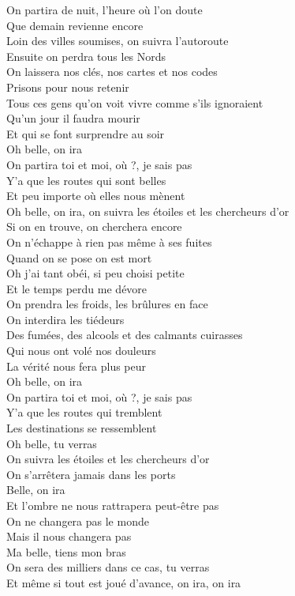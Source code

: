 \documentclass{novel}
\begin{document}
\begin{multicols}{2}
On partira de nuit, l'heure où l'on doute \\
Que demain revienne encore \\
Loin des villes soumises, on suivra l'autoroute \\
Ensuite on perdra tous les Nords \\

On laissera nos clés, nos cartes et nos codes \\
Prisons pour nous retenir \\
Tous ces gens qu'on voit vivre comme s'ils ignoraient \\
Qu'un jour il faudra mourir \\

Et qui se font surprendre au soir \\

Oh belle, on ira \\
On partira toi et moi, où ?, je sais pas \\
Y'a que les routes qui sont belles \\
Et peu importe où elles nous mènent \\
Oh belle, on ira, on suivra les étoiles et les chercheurs d'or \\
Si on en trouve, on cherchera encore \\

On n'échappe à rien pas même à ses fuites \\
Quand on se pose on est mort \\
Oh j'ai tant obéi, si peu choisi petite \\
Et le temps perdu me dévore \\

On prendra les froids, les brûlures en face \\
On interdira les tiédeurs \\
Des fumées, des alcools et des calmants cuirasses \\
Qui nous ont volé nos douleurs \\
La vérité nous fera plus peur \\

Oh belle, on ira \\
On partira toi et moi, où ?, je sais pas \\
Y'a que les routes qui tremblent \\
Les destinations se ressemblent \\
Oh belle, tu verras \\
On suivra les étoiles et les chercheurs d'or \\
On s'arrêtera jamais dans les ports \\

Belle, on ira \\
Et l'ombre ne nous rattrapera peut-être pas \\
On ne changera pas le monde \\
Mais il nous changera pas \\
Ma belle, tiens mon bras \\
On sera des milliers dans ce cas, tu verras \\
Et même si tout est joué d'avance, on ira, on ira
\end{multicols}
\end{document}
